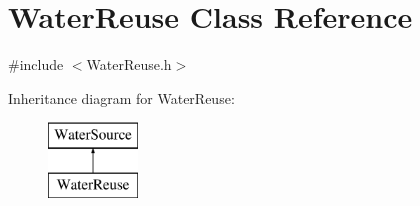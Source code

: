 \hypertarget{classWaterReuse}{}\section{Water\+Reuse Class Reference}
\label{classWaterReuse}


{\ttfamily \#include $<$Water\+Reuse.\+h$>$}

Inheritance diagram for Water\+Reuse\+:\begin{figure}[H]
\begin{center}
\leavevmode
\includegraphics[height=2.000000cm]{classWaterReuse}
\end{center}
\end{figure}
